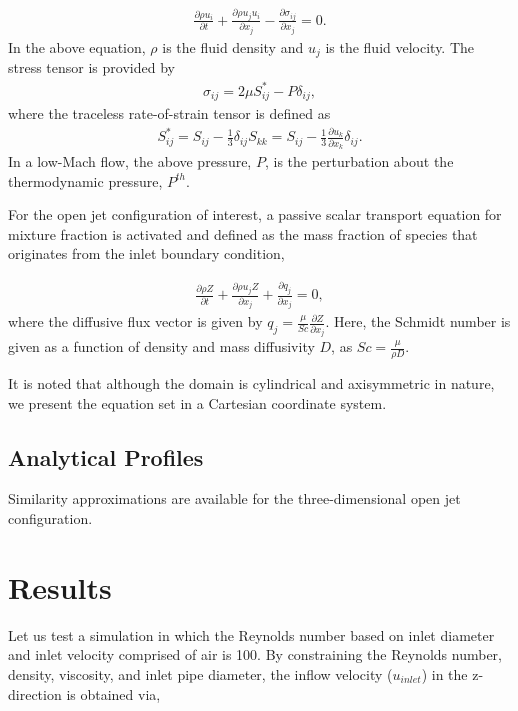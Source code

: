\documentclass{article}
\begin{document}
\begin{align}
  \frac {\partial \rho u_i }{\partial t} + \frac{ \partial \rho u_j u_i}{\partial x_j} 
-\frac{\partial \sigma_{ij}}{\partial x_j} = 0.
\label{eq:momEq}
\end{align}
%
In the above equation, $\rho$ is the fluid density and $u_j$ is the fluid velocity. 
The stress tensor is provided by
\begin{align}
\sigma_{ij}  = 2 \mu S^*_{ij} - P \delta_{ij},
\end{align}
%
where the traceless rate-of-strain tensor is defined as
\begin{align}
S^*_{ij}  = S_{ij} - \frac{1}{3} \delta_{ij} S_{kk} \nonumber
		     = S_{ij} - \frac{1}{3} \frac{\partial  u_k }{\partial x_k}\delta_{ij}.
\end{align}
In a low-Mach flow, the above pressure, $P$, is the perturbation about the thermodynamic
pressure, $P^{th}$. 

For the open jet configuration of interest, a passive scalar transport equation for mixture 
fraction is activated and defined as the mass fraction of species that originates 
from the inlet boundary condition,

\begin{align}
  \frac {\partial \rho Z }{\partial t} + \frac{ \partial \rho u_j Z}{\partial x_j} 
+\frac{\partial q_j }{\partial x_j} = 0,
\label{eq:zEq}
\end{align}
where the diffusive flux vector is given by $q_j = \frac{\mu}{Sc}\frac{\partial Z}{\partial x_j}$.
Here, the Schmidt number is given as a function of density and mass diffusivity $D$, as
$Sc = \frac{\mu}{\rho D}$. 

It is noted that although the domain is cylindrical and axisymmetric in nature, we present
the equation set in a Cartesian coordinate system.

\subsection{Analytical Profiles}
Similarity approximations are available for the three-dimensional open jet configuration.

\section{Results}
Let us test a simulation in which the Reynolds number based on inlet diameter and 
inlet velocity comprised of air is 100. By constraining the Reynolds number, density, viscosity,
and inlet pipe diameter, the inflow velocity ($u_{inlet}$) in the z-direction is obtained via,
\end{document}
